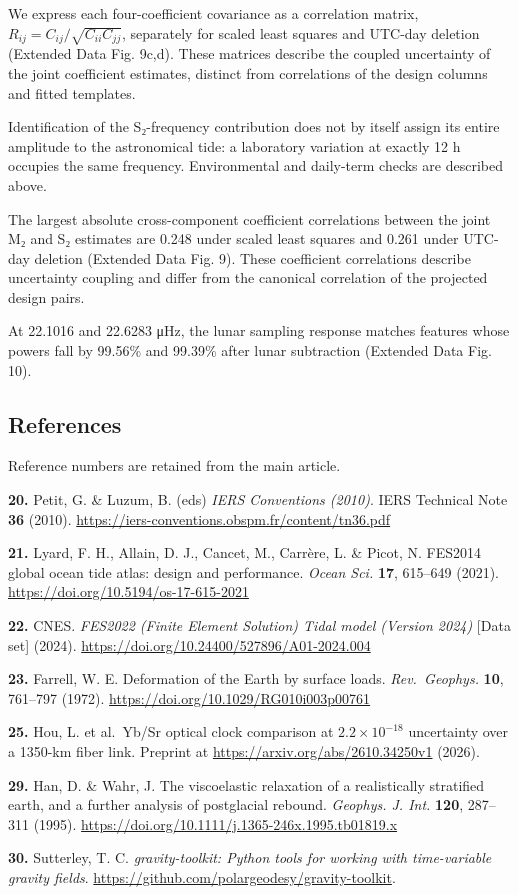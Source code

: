 \documentclass[
  11pt,
  a4paper,
]{article}
\begin{document}
We express each four-coefficient covariance as a correlation matrix,
\(R_{ij}=C_{ij}/\sqrt{C_{ii}C_{jj}}\), separately for scaled least
squares and UTC-day deletion (Extended Data Fig. 9c,d). These matrices
describe the coupled uncertainty of the joint coefficient estimates,
distinct from correlations of the design columns and fitted templates.

Identification of the S₂-frequency contribution does not by itself
assign its entire amplitude to the astronomical tide: a laboratory
variation at exactly 12 h occupies the same frequency. Environmental and
daily-term checks are described above.

The largest absolute cross-component coefficient correlations between
the joint M₂ and S₂ estimates are 0.248 under scaled least squares and
0.261 under UTC-day deletion (Extended Data Fig. 9). These coefficient
correlations describe uncertainty coupling and differ from the canonical
correlation of the projected design pairs.

At 22.1016 and 22.6283 μHz, the lunar sampling response matches features
whose powers fall by 99.56\% and 99.39\% after lunar subtraction
(Extended Data Fig. 10).

\hypertarget{references}{%
\subsection{References}\label{references}}

Reference numbers are retained from the main article.

\textbf{20.} Petit, G. \& Luzum, B. (eds) \emph{IERS Conventions
(2010)}. IERS Technical Note \textbf{36} (2010).
\url{https://iers-conventions.obspm.fr/content/tn36.pdf}

\textbf{21.} Lyard, F. H., Allain, D. J., Cancet, M., Carrère, L. \&
Picot, N. FES2014 global ocean tide atlas: design and performance.
\emph{Ocean Sci.} \textbf{17}, 615--649 (2021).
\url{https://doi.org/10.5194/os-17-615-2021}

\textbf{22.} CNES. \emph{FES2022 (Finite Element Solution) Tidal model
(Version 2024)} {[}Data set{]} (2024).
\url{https://doi.org/10.24400/527896/A01-2024.004}

\textbf{23.} Farrell, W. E. Deformation of the Earth by surface loads.
\emph{Rev.~Geophys.} \textbf{10}, 761--797 (1972).
\url{https://doi.org/10.1029/RG010i003p00761}

\textbf{25.} Hou, L. et al.~Yb/Sr optical clock comparison at
\(2.2\times10^{-18}\) uncertainty over a 1350-km fiber link. Preprint at
\url{https://arxiv.org/abs/2610.34250v1} (2026).

\textbf{29.} Han, D. \& Wahr, J. The viscoelastic relaxation of a
realistically stratified earth, and a further analysis of postglacial
rebound. \emph{Geophys. J. Int.} \textbf{120}, 287--311 (1995).
\url{https://doi.org/10.1111/j.1365-246x.1995.tb01819.x}

\textbf{30.} Sutterley, T. C. \emph{gravity-toolkit: Python tools for
working with time-variable gravity fields}.
\url{https://github.com/polargeodesy/gravity-toolkit}.
\end{document}
